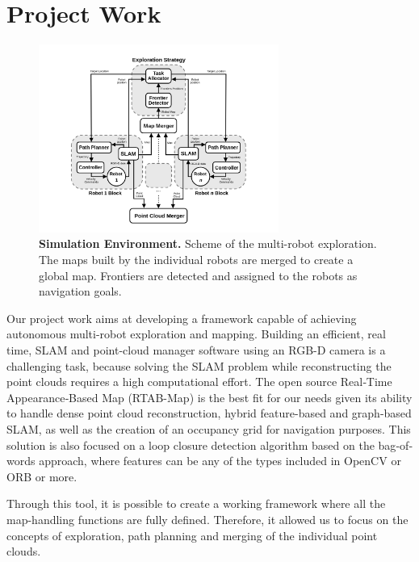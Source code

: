 \section{Project Work}
\label{sec:methods}
\begin{figure}[t]
  \begin{center}
    \includegraphics[width=0.7\textwidth]{img/simulation.png}
  \end{center}
  \caption[]{
    \textbf{Simulation Environment.} 
    Scheme of the multi-robot exploration. The maps built by the individual robots are merged to create a global map. Frontiers are detected and assigned to the robots as navigation goals.
  }
  \label{fig:simulation}
\end{figure}

%
Our project work aims at developing a framework capable of achieving autonomous multi-robot exploration and mapping. Building an efficient, real time, SLAM and point-cloud manager software using an RGB-D camera is a challenging task, because solving the SLAM problem while reconstructing the point clouds requires a high computational effort. The open source Real‐Time Appearance‐Based Map (RTAB-Map) \cite{rtabmap} is the best fit for our needs given its ability to handle dense point cloud reconstruction, hybrid feature-based and graph-based SLAM, as well as the creation of an occupancy grid for navigation purposes. This solution is also focused on a loop closure detection algorithm based on the bag‐of‐words approach, where features can be any of the types included in OpenCV or ORB or more. 

Through this tool, it is possible to create a working framework where all the map-handling functions are fully defined. Therefore, it allowed us to focus on the concepts of exploration, path planning and merging of the individual point clouds. 

